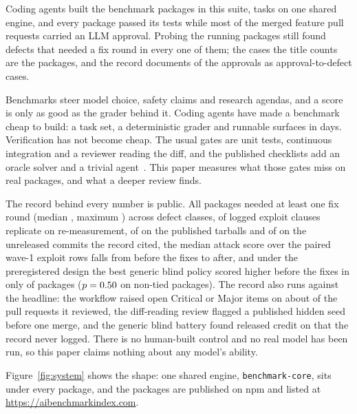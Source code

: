 Coding agents built the \suitePackages{} benchmark packages in this suite, \suiteTasks{} tasks on one shared engine, and every package passed its tests while most of the \councilMergedFeature{} merged feature pull requests carried an LLM approval. Probing the running packages still found defects that needed a fix round in every one of them; the \suitePackages{} cases the title counts are the packages, and the record documents \approvalDefectCases{} of the \councilMergedApproved{} approvals as approval-to-defect cases.

Benchmarks steer model choice, safety claims and research agendas, and a score is only as good as the grader behind it. Coding agents have made a benchmark cheap to build: a task set, a deterministic grader and runnable surfaces in days. Verification has not become cheap. The usual gates are unit tests, continuous integration and a reviewer reading the diff, and the published checklists add an oracle solver and a trivial agent~\cite{reuel2024betterbench,zhu2025abc}. This paper measures what those gates miss on \suitePackages{} real packages, and what a deeper review finds.

The record behind every number is public. All \reviewPackages{} packages needed at least one fix round (median \reviewRoundsMedian{}, maximum \reviewRoundsMax{}) across  defect classes, \expExplReplicated{} of \expExplRecordClauses{} logged exploit clauses replicate on re-measurement, \expExplReplReleased{} of \expExplRecordReleased{} on the published tarballs and \expExplReplCommit{} of \expExplRecordCommit{} on the unreleased commits the record cited, the median attack score over the \expExplAtkPairs{} paired wave-1 exploit rows falls from \expExplAtkMedianOldPaired{} before the fixes to \expExplAtkMedianNewPaired{} after, and under the preregistered design the best generic blind policy scored higher before the fixes in only \trivialHigherOld{} of \trivialPackages{} packages ($p = 0.50{}$ on \trivialSignN{} non-tied packages). The record also runs against the headline: the workflow raised open Critical or Major items on about \councilSeverityPrsRead{} of the \councilPrsReviewed{} pull requests it reviewed, the diff-reading review flagged a published hidden seed before one merge, and the generic blind battery found released credit on \expTrivialReleasedMaxPkgs{} that the record never logged. There is no human-built control and no real model has been run, so this paper claims nothing about any model's ability.

Figure~\ref{fig:system} shows the shape: one shared engine, \texttt{benchmark-core}, sits under every package, and the packages are published on npm and listed at \url{https://aibenchmarkindex.com}.

